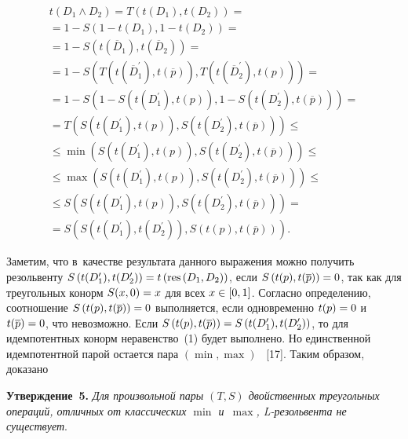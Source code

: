 \begin{multicols}{2}
\noindent
  \begin{multline*}
  t(D_1\wedge D_2) =T(t(D_1), t(D_2))={}\\[1pt]
  {}= 1-S(1-t(D_1), 1-t(D_2)) ={}\\[1pt]
  {}=
  1- S\left(t(\overline{D}_1), t(\overline{D}_2)\right)={}\\[1pt]
  {}= 1-S\left(T\left(t\left(\overline{D}_1^\prime\right), t(\overline{p})\right), T\left( 
t\left(\overline{D}_2^\prime\right), t(p)\right)\right) ={}\\[1pt]
{}=
  1-S\left( 1-S\left( 
  t\left(D_1^\prime\right), t(p)\right), 1-S\left( t\left(D_2^\prime\right), 
t(\overline{p})\right)\right)={}\\[1pt]
  {}=
  T\left( S\left(t\left(D_1^\prime\right), t(p)\right), S\left(t\left(D_2^\prime\right), t\left(\overline{p}\right)\right)\right) \leq{}\\[1pt]
  {}\leq
  \min\left( S(t(D_1^\prime), t(p)), S(t(D_2^\prime), t(\overline{p}))\right)\leq{}\\[1pt]
  {}\leq
  \max (S(t(D_1^\prime), t(p)), S(t(D_2^\prime), t(\overline{p})))\leq{}\\[1pt]
  {}\leq
  S(S(t(D_1^\prime), t(p)), S(t(D_2^\prime), t(\overline{p})))={}\\[1pt]
  {}=
  S \left(S\left(t(D_1^\prime), t(D_2^\prime)\right), S\left( t(p), t(\overline{p}) 
\right)\right).
  \end{multline*}
  
  \vspace*{-4pt}
  
  Заметим, что в~качестве результата данного выражения можно получить 
резольвенту $S\left(t(D_1^\prime), t(D_2^\prime)\right)\hm= t\left(\mathrm{res}\,(D_1, 
D_2)\right)$, если $S\left(t(p), t(\overline{p})\right)\hm=0$, так как для 
треугольных конорм $S(x,0)\hm=x$ для всех $x\hm\in [0,1]$. Согласно 
определению, соотношение $S\left(t(p), t(\overline{p})\right)\hm=0$ 
выполняется, если одновременно $t(p)\hm= 0$ и~$t(\overline{p})\hm=0$, что 
невозможно. Если $S\left( t(p), t(\overline{p})\right)\hm= S\left(t(D_1^\prime), 
t(D_2^\prime)\right)$, то для идемпотентных конорм неравенство~(1) будет 
выполнено. Но единственной идемпотентной парой остается пара $(\min, 
\max)$ ~[17]. Таким образом, доказано

  \smallskip
  
  \noindent
  \textbf{Утверждение~5.} \textit{Для произвольной пары $(T,S)$ 
двойственных треугольных операций, отличных от классических $\min$ 
и~$\max$, L-ре\-золь\-вен\-та не существует}.
  

\end{multicols}
